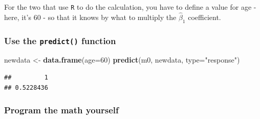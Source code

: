 \documentclass[]{article}
\newenvironment{Shaded}{\begin{snugshade}}{\end{snugshade}}
\newcommand{\CommentTok}[1]{\textcolor[rgb]{0.56,0.35,0.01}{\textit{#1}}}
\newcommand{\DataTypeTok}[1]{\textcolor[rgb]{0.13,0.29,0.53}{#1}}
\newcommand{\DecValTok}[1]{\textcolor[rgb]{0.00,0.00,0.81}{#1}}
\newcommand{\KeywordTok}[1]{\textcolor[rgb]{0.13,0.29,0.53}{\textbf{#1}}}
\newcommand{\NormalTok}[1]{#1}
\newcommand{\OperatorTok}[1]{\textcolor[rgb]{0.81,0.36,0.00}{\textbf{#1}}}
\newcommand{\StringTok}[1]{\textcolor[rgb]{0.31,0.60,0.02}{#1}}
\begin{document}
For the two that use \texttt{R} to do the calculation, you have to
define a value for age - here, it's 60 - so that it knows by what to
multiply the \(\hat\beta_1\) coefficient.

\hypertarget{use-the-predict-function}{%
\subsubsection{\texorpdfstring{Use the \texttt{predict()}
function}{Use the predict() function}}\label{use-the-predict-function}}

\begin{Shaded}
\begin{Highlighting}[]
\NormalTok{newdata <-}\StringTok{ }\KeywordTok{data.frame}\NormalTok{(}\DataTypeTok{age=}\DecValTok{60}\NormalTok{)}
\KeywordTok{predict}\NormalTok{(m0, newdata, }\DataTypeTok{type=}\StringTok{"response"}\NormalTok{)}
\end{Highlighting}
\end{Shaded}

\begin{verbatim}
##         1 
## 0.5228436
\end{verbatim}

\hypertarget{program-the-math-yourself}{%
\subsubsection{Program the math
yourself}\label{program-the-math-yourself}}

\begin{Shaded}
\end{Shaded}
\end{document}
